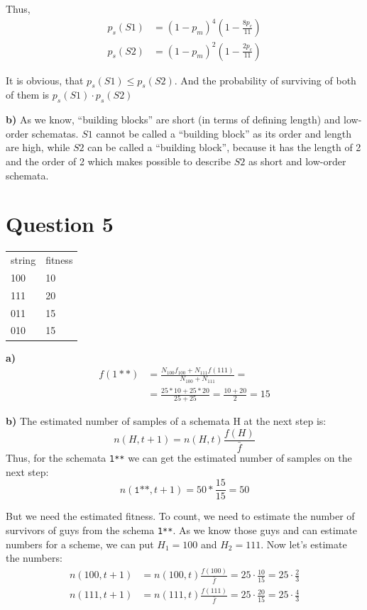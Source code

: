 \documentclass[12pt, a4paper]{article}
\begin{document}
        Thus,
        \begin{align*}
            p_s(S1) &= (1 - p_m)^4 (1 - \frac{8 p_c}{11})\\
            p_s(S2) &= (1 - p_m)^2 (1 - \frac{2 p_c}{11})
        \end{align*}

        It is obvious, that $p_s(S1) \leq p_s(S2)$. And the probability of
        surviving of both of them is $p_s(S1) \cdot p_s(S2)$

        {\bf b)} As we know, ``building blocks'' are short (in terms of defining
        length) and low-order schematas. $S1$ cannot be called a ``building
        block'' as its order and length are high, while $S2$ can be called
        a ``building block'', because it has the length of 2 and the order
        of 2 which makes possible to describe $S2$ as short and low-order
        schemata.

    \section{Question 5}
        \begin{table}[H]
        \centering
            \begin{tabular}{ll}
            \rowcolor[HTML]{C0C0C0}
            string & fitness \\
            100    & 10      \\
            111    & 20      \\
            011    & 15      \\
            010    & 15
            \end{tabular}
        \end{table}

        {\bf a)}
        \begin{align*}
            f(1**) &= \frac{N_{100} f_{100} + N_{111} f(111)}{N_{100} + N_{111}} =\\
            &= \frac{25 * 10 + 25 * 20}{25 + 25} = \frac{10 + 20}{2} = 15
        \end{align*}

        {\bf b)}
        The estimated number of samples of a schemata H at the next step is:
        $$n(H, t+1) = n(H, t) \frac{f(H)}{\bar{f}}$$
        Thus, for the schemata \texttt{1**} we can get the estimated number of samples
        on the next step:
        $$n(\texttt{1**}, t+1) = 50 * \frac{15}{15} = 50$$

        But we need the estimated fitness. To count, we need to estimate the number
        of survivors of guys from the schema \texttt{1**}. As we know those guys and can
        estimate numbers for a scheme, we can put $H_1 = 100$ and $H_2 = 111$. Now
        let's estimate the numbers:
        \begin{align*}
            n(100, t+1) &= n(100, t) \frac{f(100)}{\bar{f}} = 25 \cdot \frac{10}{15} = 25 \cdot \frac{2}{3}\\
            n(111, t+1) &= n(111, t) \frac{f(111)}{\bar{f}} = 25 \cdot \frac{20}{15} = 25 \cdot \frac{4}{3}
        \end{align*}
\end{document}
